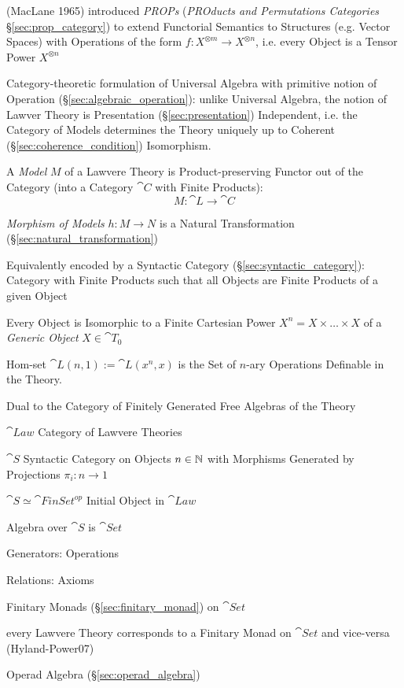 \fist (MacLane 1965) introduced \emph{PROPs} (\emph{PROducts and Permutations
  Categories} \S\ref{sec:prop_category}) to extend Functorial Semantics to
Structures (e.g. Vector Spaces) with Operations of the form $f : X^{\otimes m}
\rightarrow X^{\otimes n}$, i.e. every Object is a Tensor Power $X^{\otimes n}$

Category-theoretic formulation of Universal Algebra with primitive notion of
Operation (\S\ref{sec:algebraic_operation}): unlike Universal Algebra, the
notion of Lawver Theory is Presentation (\S\ref{sec:presentation}) Independent,
i.e. the Category of Models determines the Theory uniquely up to Coherent
(\S\ref{sec:coherence_condition}) Isomorphism. \cite{hyland-power06}

A \emph{Model} $M$ of a Lawvere Theory is Product-preserving Functor out of the
Category (into a Category $\cat{C}$ with Finite Products):
\[
  M : \cat{L} \rightarrow \cat{C}
\]

\emph{Morphism of Models} $h : M \rightarrow N$ is a Natural Transformation
(\S\ref{sec:natural_transformation})

Equivalently encoded by a Syntactic Category (\S\ref{sec:syntactic_category}):
Category with Finite Products such that all Objects are Finite Products of a
given Object

Every Object is Isomorphic to a Finite Cartesian Power $X^n = X \times \ldots
\times X$ of a \emph{Generic Object} $X \in \cat{T}_0$

Hom-set $\cat{L}(n,1) := \cat{L}(x^n,x)$ is the Set of $n$-ary Operations
Definable in the Theory.

Dual to the Category of Finitely Generated Free Algebras of the Theory

$\cat{Law}$ Category of Lawvere Theories

$\cat{S}$ Syntactic Category on Objects $n \in \mathbb{N}$ with Morphisms Generated
by Projections $\pi_i : n \rightarrow 1$

$\cat{S} \simeq \cat{FinSet}^{op}$ Initial Object in $\cat{Law}$

Algebra over $\cat{S}$ is $\cat{Set}$

Generators: Operations

Relations: Axioms

Finitary Monads (\S\ref{sec:finitary_monad}) on $\cat{Set}$

every Lawvere Theory corresponds to a Finitary Monad on $\cat{Set}$ and
vice-versa (Hyland-Power07)

Operad Algebra (\S\ref{sec:operad_algebra})

